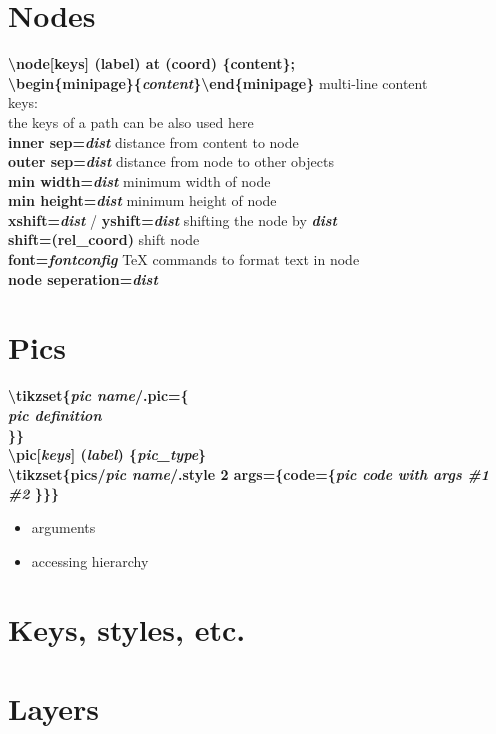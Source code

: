 \documentclass[10pt]{article}
\newcommand{\tikzcmd}[1]{\textbf{#1}}
\newcommand{\tikzparam}[1]{\textbf{\emph{#1}}}
\begin{document}
\begin{multicols}{2}
        \section{Nodes}
        \tikzcmd{\textbackslash node[keys] (label) at (coord) \{content\};}\\
        \tikzcmd{\textbackslash begin\{minipage\}\{\tikzparam{content}\}\textbackslash end\{minipage\} } multi-line content\\
        keys:\\
        the keys of a path can be also used here\\
        \tikzcmd{inner sep=\tikzparam{dist}} distance from content to node\\
        \tikzcmd{outer sep=\tikzparam{dist}} distance from node to other objects\\
        \tikzcmd{min width=\tikzparam{dist}} minimum width of node\\
        \tikzcmd{min height=\tikzparam{dist}} minimum height of node\\
        \tikzcmd{xshift=\tikzparam{dist}} / \tikzcmd{yshift=\tikzparam{dist}} shifting the node by \tikzparam{dist}\\
        \tikzcmd{shift=(rel\_coord)} shift node\\
        \tikzcmd{font=\tikzparam{fontconfig}} TeX commands to format text in node\\
        \tikzcmd{node seperation=\tikzparam{dist}}

        \section{Pics}
        \tikzcmd{\textbackslash tikzset\{\tikzparam{pic name}/.pic=\{\\
           \tikzparam{pic definition}\\
        \}\}}\\
        \tikzcmd{\textbackslash pic[\tikzparam{keys}] (\tikzparam{label}) \{\tikzparam{pic\_type}\} }\\
        \tikzcmd{\textbackslash tikzset\{pics/\tikzparam{pic name}/.style 2 args=\{code=\{\tikzparam{pic code with args \#1 \#2} \}\}\}}\\

        \begin{itemize}
            \item arguments
            \item accessing hierarchy
        \end{itemize}

        \section{Keys, styles, etc.}

        \section{Layers}

    \end{multicols}
\end{document}
